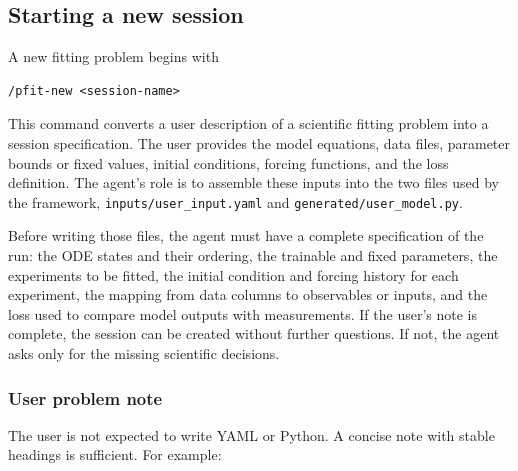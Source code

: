 \subsection{Starting a new session}
\label{sec:starting-new-session}

A new fitting problem begins with

\begin{verbatim}
/pfit-new <session-name>
\end{verbatim}

This command converts a user description of a scientific fitting problem into a
session specification. The user provides the model equations, data files,
parameter bounds or fixed values, initial conditions, forcing functions, and the
loss definition. The agent's role is to assemble these inputs into the two files
used by the framework, \texttt{inputs/user\_input.yaml} and
\texttt{generated/user\_model.py}.

Before writing those files, the agent must have a complete specification of the
run: the ODE states and their ordering, the trainable and fixed parameters, the
experiments to be fitted, the initial condition and forcing history for each
experiment, the mapping from data columns to observables or inputs, and the
loss used to compare model outputs with measurements. If the user's note is
complete, the session can be created without further questions. If not, the
agent asks only for the missing scientific decisions.

\subsubsection{User problem note}

The user is not expected to write YAML or Python. A concise note with stable
headings is sufficient. For example:

